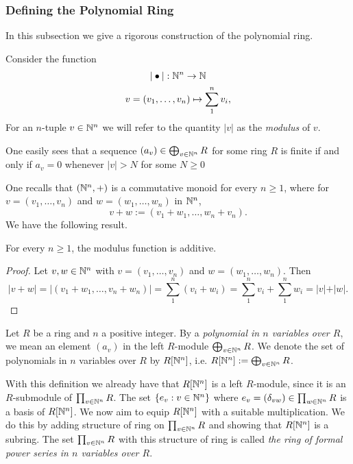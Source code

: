 \subsubsection{Defining the Polynomial Ring} 
In this subsection we give a rigorous construction of the polynomial ring. 
\begin{definition}
    Consider the function 
    \begin{gather*}
        \vert \bullet \vert : \mathbb{N}^n \rightarrow \mathbb{N}\\
        v=(v_1,\dots,v_n) \mapsto \sum_1^n v_i,
    \end{gather*}
    For an $n$-tuple $v\in \mathbb{N}^n$ we will refer to the quantity $\vert v\vert$ as the \textit{modulus} of $v$.
\end{definition}
\begin{remark}
    One easily sees that a sequence $(a_v) \in \bigoplus_{v\in \mathbb{N}^n} R$ for some ring $R$ is finite if and only if $a_v = 0$ whenever $\vert v\vert > N$ for some $N\geq 0$
\end{remark}
One recalls that $(\mathbb{N}^n,+)$ is a commutative monoid for every $n\geq 1$, where for $v=(v_1,\dots,v_n)$ and $w = (w_1,\dots,w_n)$ in $\mathbb{N}^n$,
$$v+w := (v_1+w_1,\dots,w_n+v_n).$$ 
We have the following result. 
\begin{lemma}\label{ModulusFunctionIsAdditive}
    For every $n\geq 1$, the modulus function is additive.
\end{lemma}
\begin{proof}
    Let $v,w\in \mathbb{N}^n$ with $v=(v_1,\dots,v_n)$ and $w=(w_1,\dots,w_n)$. Then
    $$\vert v+w\vert = \vert (v_1+w_1,\dots,v_n+w_n)\vert = \sum_1^n (v_i+w_i) = \sum_1^n v_i + \sum_1^n w_i = \vert v\vert +\vert w\vert.$$
\end{proof}
\begin{definition}
    Let $R$ be a ring and $n$ a positive integer. By a \textit{polynomial in $n$ variables over $R$}, we mean an element $(a_v)$ in the left $R$-module $\bigoplus_{v\in \mathbb{N}^n} R$. We denote the set of polynomials in $n$ variables over $R$ by $R[\mathbb{N}^n]$, i.e. $R[\mathbb{N}^n] := \bigoplus_{v\in \mathbb{N}^n} R$.
\end{definition}
With this definition we already have that $R[\mathbb{N}^n]$ is a left $R$-module, since it is an $R$-submodule of $\prod_{v\in \mathbb{N}^n} R$. The set $\{e_v : v\in \mathbb{N}^n\}$ where $e_v = (\delta_{vw})\in \prod_{w\in \mathbb{N}^n} R$ is a basis of $R[\mathbb{N}^n]$. We now aim to equip $R[\mathbb{N}^n]$ with a suitable multiplication. We do this by adding structure of ring on $\prod_{v\in \mathbb{N}^n} R$ and showing that $R[\mathbb{N}^n]$ is a subring. The set $\prod_{v\in \mathbb{N}^n} R$ with this structure of ring is called \textit{the ring of formal power series in $n$ variables over $R$}. 
